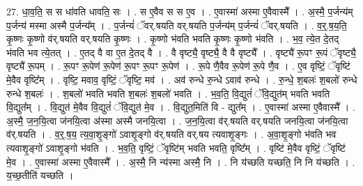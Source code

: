 \documentclass[17pt]{extarticle}
\begin{document}
27. धा॒व॒ति॒ स स धा॑वति धावति॒ सः । . स ए॒वैव स स ए॒व । . ए॒वास्मा॑ अस्मा ए॒वैवास्मै᳚ । . अ॒स्मै॒ प॒र्जन्य॑म् प॒र्जन्य॑ मस्मा अस्मै प॒र्जन्य᳚म् । . प॒र्जन्यं॑ ॅवर्.षयति वर्.षयति प॒र्जन्य॑म् प॒र्जन्यं॑ ॅवर्.षयति । . व॒र्॒.ष॒य॒ति॒ कृ॒ष्णः कृ॒ष्णो व॑र्.षयति वर्.षयति कृ॒ष्णः । . कृ॒ष्णो भ॑वति भवति कृ॒ष्णः कृ॒ष्णो भ॑वति । . भ॒व॒ त्ये॒त दे॒तद् भ॑वति भव त्ये॒तत् । . ए॒तद् वै वा ए॒त दे॒तद् वै । . वै वृष्ट्यै॒ वृष्ट्यै॒ वै वै वृष्ट्यै᳚ । . वृष्ट्यै॑ रू॒पꣳ रू॒पं ॅवृष्ट्यै॒ वृष्ट्यै॑ रू॒पम् । . रू॒पꣳ रू॒पेण॑ रू॒पेण॑ रू॒पꣳ रू॒पꣳ रू॒पेण॑ । . रू॒पे णै॒वैव रू॒पेण॑ रू॒पे णै॒व । . ए॒व वृष्टिं॒ ॅवृष्टि॑ मे॒वैव वृष्टि᳚म् । . वृष्टि॒ मवाव॒ वृष्टिं॒ ॅवृष्टि॒ मव॑ । . अव॑ रुन्धे रु॒न्धे ऽवाव॑ रुन्धे । . रु॒न्धे॒ श॒बलः॑ श॒बलो॑ रुन्धे रुन्धे श॒बलः॑ । . श॒बलो॑ भवति भवति श॒बलः॑ श॒बलो॑ भवति । . भ॒व॒ति॒ वि॒द्युतं॑ ॅवि॒द्युत॑म् भवति भवति वि॒द्युत᳚म् । . वि॒द्युत॑ मे॒वैव वि॒द्युतं॑ ॅवि॒द्युत॑ मे॒व । . वि॒द्युत॒मिति॑ वि - द्युत᳚म् । . ए॒वास्मा॑ अस्मा ए॒वैवास्मै᳚ । . अ॒स्मै॒ ज॒न॒यि॒त्वा ज॑नयि॒त्वा अ॑स्मा अस्मै जनयि॒त्वा । . ज॒न॒यि॒त्वा व॑र्.षयति वर्.षयति जनयि॒त्वा ज॑नयि॒त्वा व॑र्.षयति । . व॒र्॒.ष॒य॒ त्य॒वा॒शृ॒ङ्गो॑ ऽवाशृ॒ङ्गो व॑र्.षयति वर्.षय त्यवाशृ॒ङ्गः । . अ॒वा॒शृ॒ङ्गो भ॑वति भव त्यवाशृ॒ङ्गो॑ ऽवाशृ॒ङ्गो भ॑वति । . भ॒व॒ति॒ वृष्टिं॒ ॅवृष्टि॑म् भवति भवति॒ वृष्टि᳚म् । . वृष्टि॑ मे॒वैव वृष्टिं॒ ॅवृष्टि॑ मे॒व । . ए॒वास्मा॑ अस्मा ए॒वैवास्मै᳚ । . अ॒स्मै॒ नि न्य॑स्मा अस्मै॒ नि । . नि य॑च्छति यच्छति॒ नि नि य॑च्छति । . य॒च्छ॒तीति॑ यच्छति । \newline
\end{document}
